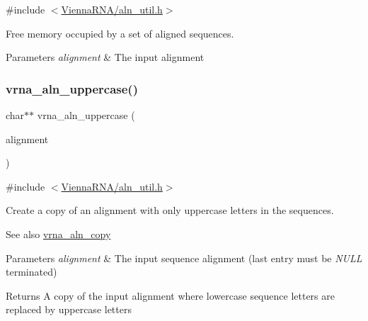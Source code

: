 {\ttfamily \#include $<$\mbox{\hyperlink{aln__util_8h}{Vienna\+R\+N\+A/aln\+\_\+util.\+h}}$>$}



Free memory occupied by a set of aligned sequences. 


\begin{DoxyParams}{Parameters}
{\em alignment} & The input alignment \\
\hline
\end{DoxyParams}
\mbox{\label{group__aln__utils_ga3a0476a71c4bae3d302790de58055704}} 
\subsubsection{\texorpdfstring{vrna\+\_\+aln\+\_\+uppercase()}{vrna\_aln\_uppercase()}}
{\footnotesize\ttfamily char$\ast$$\ast$ vrna\+\_\+aln\+\_\+uppercase (\begin{DoxyParamCaption}\item[{const char $\ast$$\ast$}]{alignment }\end{DoxyParamCaption})}



{\ttfamily \#include $<$\mbox{\hyperlink{aln__util_8h}{Vienna\+R\+N\+A/aln\+\_\+util.\+h}}$>$}



Create a copy of an alignment with only uppercase letters in the sequences. 

\begin{DoxySeeAlso}{See also}
\mbox{\hyperlink{group__aln__utils_ga08cdca592461436860daf9738279ce17}{vrna\+\_\+aln\+\_\+copy}}
\end{DoxySeeAlso}

\begin{DoxyParams}{Parameters}
{\em alignment} & The input sequence alignment (last entry must be {\itshape N\+U\+LL} terminated) \\
\hline
\end{DoxyParams}
\begin{DoxyReturn}{Returns}
A copy of the input alignment where lowercase sequence letters are replaced by uppercase letters 
\end{DoxyReturn}
\mbox{\label{group__aln__utils_ga7886fc678553c06472a712a335cde9cf}} 
